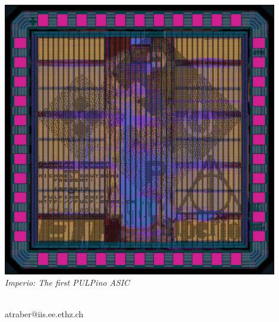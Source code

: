 \makeatletter
\begin{titlepage}

 \thispagestyle{empty}

 \begin{center}

  \begin{spacing}{2.0}
  {\Huge\textbf{\@title}}
  \end{spacing}

  \vspace{0.2cm}

  \vfill

  \includegraphics[height = 12cm]{figures/imperio_layout} \\
  {\textit{Imperio: The first PULPino ASIC}}

  \vfill

  {\Large \@author}\\
  {atraber@iis.ee.ethz.ch}
  \vfill
  \@date

 \end{center}
\end{titlepage}
\makeatother

